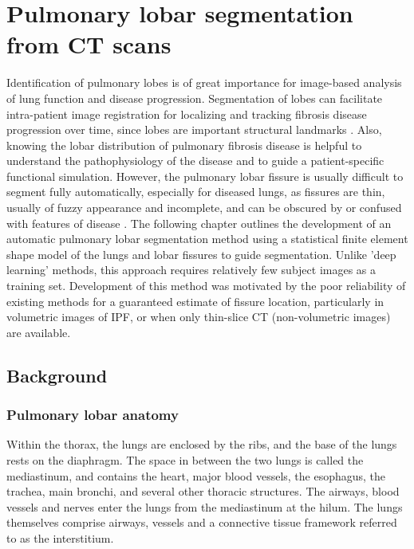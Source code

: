  \chapter{Pulmonary lobar segmentation from CT scans} \label{Yuwen_Segmentation}
Identification of pulmonary lobes is of great importance for image-based analysis of lung function and disease progression. Segmentation of lobes can facilitate intra-patient image registration for localizing and tracking fibrosis disease progression over time, since lobes are important structural landmarks \citep{lassen2011interactive}. Also, knowing the lobar distribution of pulmonary fibrosis disease is helpful to understand the pathophysiology of the disease and to guide a patient-specific functional simulation.  However, the pulmonary lobar fissure is usually difficult to segment fully automatically, especially for diseased lungs, as fissures are thin, usually of fuzzy appearance and incomplete, and can be obscured by or confused with features of disease \citep{ukil2009anatomy}. The following chapter outlines the development of an automatic pulmonary lobar segmentation method using a statistical finite element shape model of the lungs and lobar fissures to guide segmentation. Unlike 'deep learning' methods, this approach requires relatively few subject images as a training set. Development of this method was motivated by the poor reliability of existing methods for a guaranteed estimate of fissure location, particularly in volumetric images of IPF, or when only thin-slice CT (non-volumetric images) are available.

\section{Background} \label{SegmentationBackground}
\subsection{Pulmonary lobar anatomy}
Within the thorax, the lungs are enclosed by the ribs, and the base of the lungs rests on the diaphragm. The space in between the two lungs is called the mediastinum, and contains the heart, major blood vessels, the esophagus, the trachea, main bronchi, and several other thoracic structures. The airways, blood vessels and nerves enter the lungs from the mediastinum at the hilum. The lungs themselves comprise airways, vessels and a connective tissue framework referred to as the interstitium.

